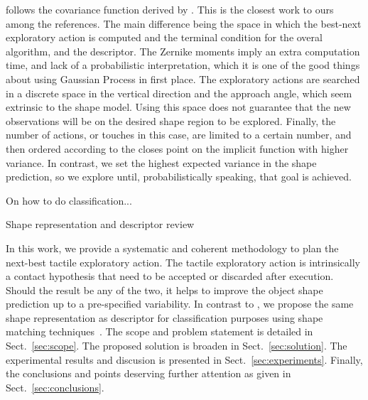 \citet{Bjorkman2013Enhancing} follows the covariance function derived by \citet{Williams2007Gaussian}. This is the closest work to ours among the references. The main difference being the space in which the best-next exploratory action is computed and the terminal condition for the overal algorithm, and the descriptor. The Zernike moments imply an extra computation time, and lack of a probabilistic interpretation, which it is one of the good things about using Gaussian Process in first place. The exploratory actions are searched in a discrete space in the vertical direction and the approach angle, which seem extrinsic to the shape model. Using this space does not guarantee that the new observations will be on the desired shape region to be explored.  Finally, the number of actions, or touches in this case, are limited to a certain number, and then ordered according to the closes point on the implicit function with higher variance. In contrast, we set the highest expected variance in the shape prediction, so we explore until, probabilistically speaking, that goal is achieved.



On how to do classification...

Shape representation and descriptor review \citet{Zhang2004Review}

In this work, we provide a systematic and coherent methodology to plan the next-best tactile exploratory action. The tactile exploratory action is intrinsically a contact hypothesis that need to be accepted or discarded after execution. Should the result be any of the two, it helps to improve the object shape prediction up to a pre-specified variability. In contrast to \citet{Bjorkman2013Enhancing}, we propose the same shape representation as descriptor for classification purposes using shape matching techniques~\citep{Belongie2002Shape}. The scope and problem statement is detailed in Sect.~\ref{sec:scope}. The proposed solution is broaden in Sect.~\ref{sec:solution}. The experimental results and discusion is presented in Sect.~\ref{sec:experiments}. Finally, the conclusions and points deserving further attention as given in Sect.~\ref{sec:conclusions}. 
